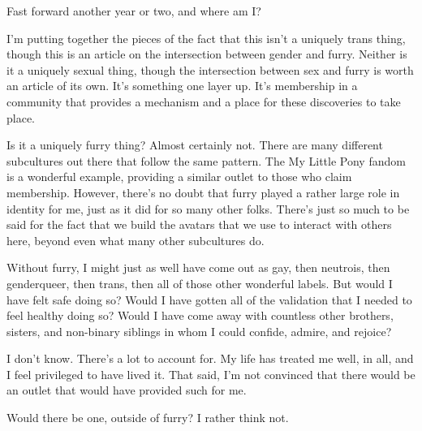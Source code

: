 Fast forward another year or two, and where am I?

I'm putting together the pieces of the fact that this isn't a uniquely trans thing, though this is an article on the intersection between gender and furry. Neither is it a uniquely sexual thing, though the intersection between sex and furry is worth an article of its own. It's something one layer up. It's membership in a community that provides a mechanism and a place for these discoveries to take place.

Is it a uniquely furry thing? Almost certainly not. There are many different subcultures out there that follow the same pattern. The My Little Pony fandom is a wonderful example, providing a similar outlet to those who claim membership. However, there's no doubt that furry played a rather large role in identity for me, just as it did for so many other folks. There's just so much to be said for the fact that we build the avatars that we use to interact with others here, beyond even what many other subcultures do.

Without furry, I might just as well have come out as gay, then neutrois, then genderqueer, then trans, then all of those other wonderful labels. But would I have felt safe doing so? Would I have gotten all of the validation that I needed to feel healthy doing so? Would I have come away with countless other brothers, sisters, and non-binary siblings in whom I could confide, admire, and rejoice?

I don't know. There's a lot to account for. My life has treated me well, in all, and I feel privileged to have lived it. That said, I'm not convinced that there would be an outlet that would have provided such for me.

Would there be one, outside of furry? I rather think not.
